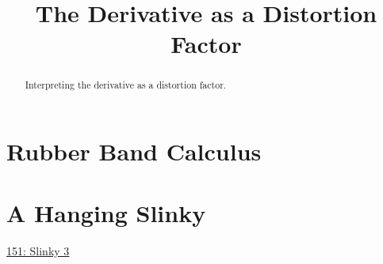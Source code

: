 \documentclass{ximera}
\title{The Derivative as a Distortion Factor}
\begin{document}
\begin{abstract}
Interpreting the derivative as a distortion factor.
\end{abstract}
\maketitle

\section{Rubber Band Calculus}

\section{A Hanging Slinky}

\begin{onlineOnly}
    \begin{center}
\end{center}
\end{onlineOnly}

\href{https://www.desmos.com/calculator/x4prb8mvuj}{151: Slinky 3}
\end{document}
